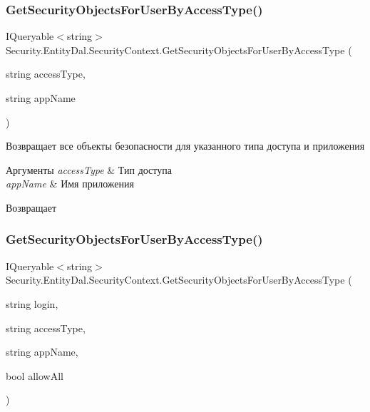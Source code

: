 \subsubsection{\texorpdfstring{Get\+Security\+Objects\+For\+User\+By\+Access\+Type()}{GetSecurityObjectsForUserByAccessType()}\hspace{0.1cm}{\footnotesize\ttfamily [1/2]}}
{\footnotesize\ttfamily I\+Queryable$<$string$>$ Security.\+Entity\+Dal.\+Security\+Context.\+Get\+Security\+Objects\+For\+User\+By\+Access\+Type (\begin{DoxyParamCaption}\item[{string}]{access\+Type,  }\item[{string}]{app\+Name }\end{DoxyParamCaption})}



Возвращает все объекты безопасности для указанного типа доступа и приложения 


\begin{DoxyParams}{Аргументы}
{\em access\+Type} & Тип доступа\\
\hline
{\em app\+Name} & Имя приложения\\
\hline
\end{DoxyParams}
\begin{DoxyReturn}{Возвращает}

\end{DoxyReturn}
\mbox{\label{class_security_1_1_entity_dal_1_1_security_context_a7e1fcf7450b038382dc13d16c8a06a47}} 
\subsubsection{\texorpdfstring{Get\+Security\+Objects\+For\+User\+By\+Access\+Type()}{GetSecurityObjectsForUserByAccessType()}\hspace{0.1cm}{\footnotesize\ttfamily [2/2]}}
{\footnotesize\ttfamily I\+Queryable$<$string$>$ Security.\+Entity\+Dal.\+Security\+Context.\+Get\+Security\+Objects\+For\+User\+By\+Access\+Type (\begin{DoxyParamCaption}\item[{string}]{login,  }\item[{string}]{access\+Type,  }\item[{string}]{app\+Name,  }\item[{bool}]{allow\+All }\end{DoxyParamCaption})}



